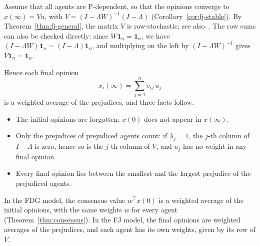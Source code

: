 Assume that all agents are P-dependent, so that the opinions converge to
$x(\infty) = Vu$, with $V = (I - \Lambda W)^{-1}(I - \Lambda)$
(Corollary~\ref{cor:fj-stable}). By Theorem~\ref{thm:fj-general}, the matrix $V$ is
row-stochastic; see also~\cite{bullo2024lns}. The row sums can also be checked
directly: since $W \mathbf{1}_n = \mathbf{1}_n$, we have
$(I - \Lambda W)\mathbf{1}_n = (I - \Lambda)\mathbf{1}_n$, and multiplying on the left
by $(I - \Lambda W)^{-1}$ gives $V \mathbf{1}_n = \mathbf{1}_n$.

Hence each final opinion
\[
  x_i(\infty) = \sum_{j=1}^{n} v_{ij}\, u_j
\]
is a weighted average of the prejudices, and three facts follow.
\begin{itemize}
  \item The initial opinions are forgotten: $x(0)$ does not appear in $x(\infty)$.
  \item Only the prejudices of prejudiced agents count: if $\lambda_j = 1$, the $j$-th
        column of $I - \Lambda$ is zero, hence so is the $j$-th column of $V$, and
        $u_j$ has no weight in any final opinion.
  \item Every final opinion lies between the smallest and the largest prejudice of the
        prejudiced agents.
\end{itemize}
In the FDG model, the consensus value $w^\top x(0)$ is a weighted average of the
initial opinions, with the same weights $w$ for every agent
(Theorem~\ref{thm:consensus}). In the FJ model, the final opinions are weighted
averages of the prejudices, and each agent has its own weights, given by its row of
$V$.

